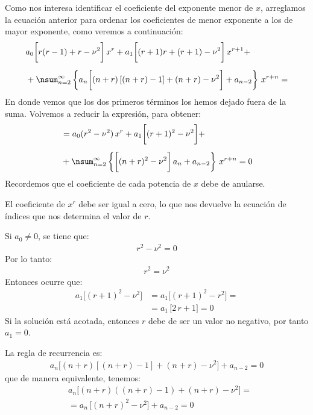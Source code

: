 Como nos interesa identificar el coeficiente del exponente menor de $x$, arreglamos la ecuación anterior para ordenar los coeficientes de menor exponente a los de mayor exponente, como veremos a continuación:
\begin{align*}
&a_{0} \bigg[ r (r - 1) + r - \nu^{2} \bigg] \, x^{r} + a_{1} \bigg[ (r + 1) r + (r + 1) - \nu^{2} \bigg] \, x^{r+1} + \\[0.5em]
&+ \nsum_{n=2}^{\infty} \left\{ a_{n} \bigg[ (n + r) \left[ (n + r) - 1 \right] + (n + r) - \nu^{2} \bigg] + a_{n-2} \right\} \, x^{r+n} =
\end{align*}
En donde vemos que los dos primeros términos los hemos dejado fuera de la suma. Volvemos a reducir la expresión, para obtener:
\begin{align*}
&= a_{0} (r^{2} - \nu^{2}) \, x^{r} + a_{1} \bigg[ (r + 1)^{2} - \nu^{2} \bigg] + \\[0.5em]
&+ \nsum_{n=2}^{\infty} \left\{ \bigg[ (n + r)^{2} - \nu^{2} \bigg] \, a_{n} + a_{n-2} \right\} \, x^{r+n} = 0
\end{align*}
Recordemos que el coeficiente de cada potencia de $x$ debe de anularse.
\par
El coeficiente de $x^{r}$ debe ser igual a cero, lo que nos devuelve la ecuación de índices que nos determina el valor de $r$.
\par
Si $a_{0} \neq 0$, se tiene que:
\begin{align*}
r^{2} - \nu^{2} = 0
\end{align*}
Por lo tanto:
\begin{align*}
r^{2} = \nu^{2}
\end{align*}
Entonces ocurre que:
\begin{align*}
a_{1} \big[ (r + 1)^{2} - \nu^{2} \big] &= a_{1} \big[ (r + 1)^{2} - r^{2} \big] = \\[0.5em]
&= a_{1} \, \big[ 2 \, r + 1 \big] = 0
\end{align*}
Si la solución está acotada, entonces $r$ debe de ser un valor no negativo, por tanto $a_{1} = 0$.
\par
La regla de recurrencia es:
\begin{align*}
a_{n} \big[ (n + r) \left[ (n + r) - 1 \right] + (n + r) - \nu^{2} \big] + a_{n-2} = 0
\end{align*}
que de manera equivalente, tenemos:
\begin{align*}
&a_{n} \big[ (n + r) \left( (n + r) - 1 \right) + (n + r) - \nu^{2} \big] = \\[0.5em]
&= a_{n} \, \big[ (n + r)^{2} - \nu^{2} \big] + a_{n-2} = 0
\end{align*}
